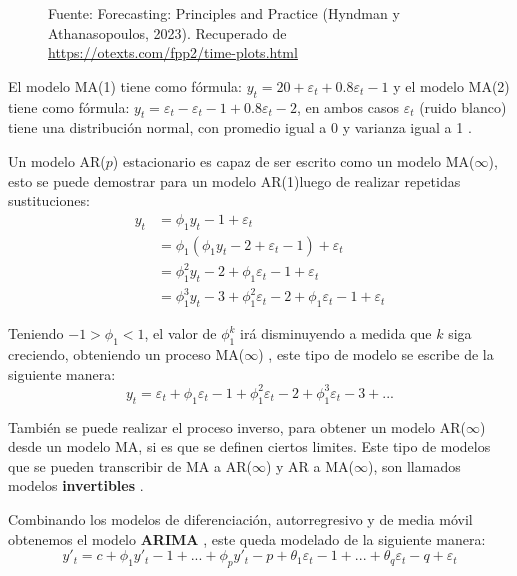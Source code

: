 \begin{itemize}
\begin{figure}[H]
        \begin{minipage}[t]{0.9\textwidth}
            Fuente: Forecasting: Principles and Practice (Hyndman y Athanasopoulos, 2023). Recuperado de \url{https://otexts.com/fpp2/time-plots.html}
        \end{minipage}
    \end{figure}

    El modelo MA(1) tiene como fórmula: $y_t=20+\varepsilon_t+0.8\varepsilon_t-1$ y el modelo MA(2) tiene como fórmula: $y_t=\varepsilon_t - \varepsilon_t-1 + 0.8\varepsilon_t-2$, en ambos casos $\varepsilon_t$ (ruido blanco) tiene una distribución normal, con promedio igual a 0 y varianza igual a 1 \cite{forecast-time-series-arima}.

    Un modelo AR($p$) estacionario es capaz de ser escrito como un modelo MA($\infty$), esto se puede demostrar para un modelo AR(1)luego de realizar repetidas sustituciones:
    \begin{equation*}
    \begin{split}
    y_t &=\phi_1y_t-1+\varepsilon_t\\  &=\phi_1(\phi_1y_t-2+\varepsilon_t-1)+\varepsilon_t\\ &=\phi^2_1y_t-2+\phi_1\varepsilon_t-1+\varepsilon_t\\ &=\phi^3_1y_t-3+\phi^2_1\varepsilon_t-2+\phi_1\varepsilon_t-1+\varepsilon_t
    \end{split}
    \end{equation*}

    Teniendo $-1>\phi_1<1$, el valor de $\phi^k_1$ irá disminuyendo a medida que $k$ siga creciendo, obteniendo un proceso MA($\infty$) \cite{forecast-time-series-arima}, este tipo de modelo se escribe de la siguiente manera:
    \begin{equation*}
        y_t=\varepsilon_t+\phi_1\varepsilon_t-1+\phi^2_1\varepsilon_t-2+\phi^3_1\varepsilon_t-3+...
    \end{equation*}

    También se puede realizar el proceso inverso, para obtener un modelo AR($\infty$) desde un modelo MA, si es que se definen ciertos limites. Este tipo de modelos que se pueden transcribir de MA a AR($\infty$) y AR a MA($\infty$), son llamados modelos \textbf{invertibles} \cite{forecast-time-series-arima}.
\end{itemize}

Combinando los modelos de diferenciación, autorregresivo y de media móvil obtenemos el modelo \textbf{ARIMA} \cite{forecast-time-series-arima}, este queda modelado de la siguiente manera:
\begin{equation*}
    y'_t=c+\phi_1y'_t-1+...+\phi_py'_t-p+\theta_1\varepsilon_t-1+...+\theta_q\varepsilon_t-q+\varepsilon_t
\end{equation*}

